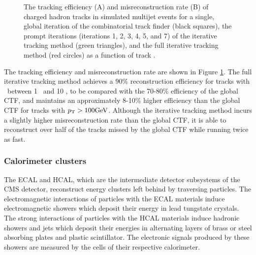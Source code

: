 \begin{figure}[htbp]
{  }
  \caption[Track Reconstruction Performance]{The tracking efficiency (A) and misreconstruction rate (B) of charged hadron tracks in simulated multijet events for a single, global iteration of the combinatorial track finder (black squares), the prompt iterations (iterations 1, 2, 3, 4, 5, and 7) of the iterative tracking method (green triangles), and the full iterative tracking method (red circles) as a function of track \pT.\cite{PARTICLEFLOW}}
    \label{fig:pftrack_perf}
\end{figure}

The tracking efficiency and misreconstruction rate are shown in Figure \ref{fig:pftrack_perf}. The full iterative tracking method achieves a 90\% reconstruction efficiency for tracks with \pT\ between 1 \GeV\ and 10 \GeV, to be compared with the 70-80\% efficiency of the global CTF, and maintains an approximately 8-10\% higher efficiency than the global CTF for tracks with $p_{\mathrm{T}} > 100 \mathrm{GeV}$. Although the iterative tracking method incurs a slightly higher misreconstruction rate than the global CTF, it is able to reconstruct over half of the tracks missed by the global CTF while running twice as fast.

\subsubsection{Calorimeter clusters}

The ECAL and HCAL, which are the intermediate detector subsystems of the CMS detector, reconstruct energy clusters left behind by traversing particles. The electromagnetic interactions of particles with the ECAL materials induce electromagnetic showers which deposit their energy in lead tungstate crystals. The strong interactions of particles with the HCAL materials induce hadronic showers and jets which deposit their energies in alternating layers of brass or steel absorbing plates and plastic scintillator. The electronic signals produced by these showers are measured by the cells of their respective calorimeter.

